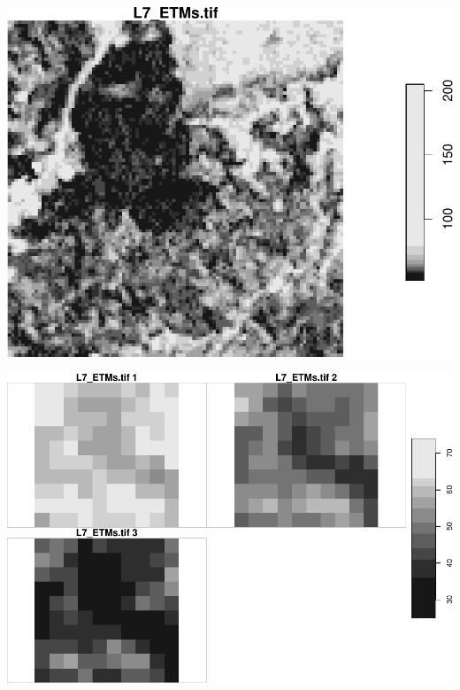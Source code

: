 \documentclass[]{article}
\newenvironment{Shaded}{\begin{snugshade}}{\end{snugshade}}
\newcommand{\DecValTok}[1]{\textcolor[rgb]{0.00,0.00,0.81}{#1}}
\newcommand{\KeywordTok}[1]{\textcolor[rgb]{0.13,0.29,0.53}{\textbf{#1}}}
\newcommand{\NormalTok}[1]{#1}
\newcommand{\OperatorTok}[1]{\textcolor[rgb]{0.81,0.36,0.00}{\textbf{#1}}}
\newcommand{\StringTok}[1]{\textcolor[rgb]{0.31,0.60,0.02}{#1}}
\begin{document}
\includegraphics{R_tidyverse_for_geographers_files/figure-latex/unnamed-chunk-35-5.pdf}

\begin{Shaded}
\end{Shaded}

\includegraphics{R_tidyverse_for_geographers_files/figure-latex/unnamed-chunk-35-6.pdf}
\end{document}
